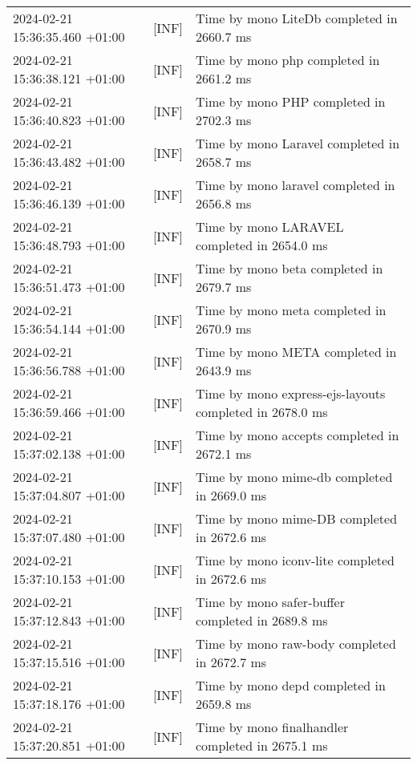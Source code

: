 {{\begin{tabularx}{\textwidth}{|l|l|X|}
                    2024-02-21 15:36:35.460 +01:00 & [INF] & Time by mono LiteDb completed in 2660.7 ms \\
                    2024-02-21 15:36:38.121 +01:00 & [INF] & Time by mono php completed in 2661.2 ms \\
                    2024-02-21 15:36:40.823 +01:00 & [INF] & Time by mono PHP completed in 2702.3 ms \\
                    2024-02-21 15:36:43.482 +01:00 & [INF] & Time by mono Laravel completed in 2658.7 ms \\
                    2024-02-21 15:36:46.139 +01:00 & [INF] & Time by mono laravel completed in 2656.8 ms \\
                    2024-02-21 15:36:48.793 +01:00 & [INF] & Time by mono LARAVEL completed in 2654.0 ms \\
                    2024-02-21 15:36:51.473 +01:00 & [INF] & Time by mono beta completed in 2679.7 ms \\
                    2024-02-21 15:36:54.144 +01:00 & [INF] & Time by mono meta completed in 2670.9 ms \\
                    2024-02-21 15:36:56.788 +01:00 & [INF] & Time by mono META completed in 2643.9 ms \\
                    2024-02-21 15:36:59.466 +01:00 & [INF] & Time by mono express-ejs-layouts completed in 2678.0 ms \\
                    2024-02-21 15:37:02.138 +01:00 & [INF] & Time by mono accepts completed in 2672.1 ms \\
                    2024-02-21 15:37:04.807 +01:00 & [INF] & Time by mono mime-db completed in 2669.0 ms \\
                    2024-02-21 15:37:07.480 +01:00 & [INF] & Time by mono mime-DB completed in 2672.6 ms \\
                    2024-02-21 15:37:10.153 +01:00 & [INF] & Time by mono iconv-lite completed in 2672.6 ms \\
                    2024-02-21 15:37:12.843 +01:00 & [INF] & Time by mono safer-buffer completed in 2689.8 ms \\
                    2024-02-21 15:37:15.516 +01:00 & [INF] & Time by mono raw-body completed in 2672.7 ms \\
                    2024-02-21 15:37:18.176 +01:00 & [INF] & Time by mono depd completed in 2659.8 ms \\
                    2024-02-21 15:37:20.851 +01:00 & [INF] & Time by mono finalhandler completed in 2675.1 ms \\

\end{tabularx}}}
